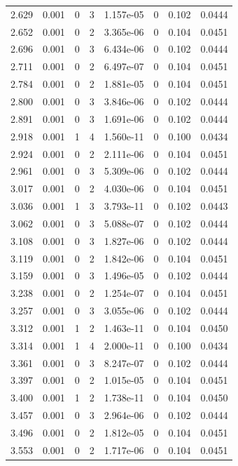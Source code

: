 \documentclass[preview]{standalone}
\begin{document}
{{{\begin{tabular}{L{1.2cm}C{1.2cm} C{0.3cm}C{0.5cm} C{1.4cm}C{1.4cm} C{1.4cm}C{1.4cm}}
  2.629  &  0.001  & 0     &  3 &  1.157e-05  & 0  & 0.102 &  0.0444   \\ 
  2.652  &  0.001  & 0     &  2 &  3.365e-06  & 0  & 0.104 &  0.0451   \\ 
  2.696  &  0.001  & 0     &  3 &  6.434e-06  & 0  & 0.102 &  0.0444   \\ 
  2.711  &  0.001  & 0     &  2 &  6.497e-07  & 0  & 0.104 &  0.0451   \\ 
  2.784  &  0.001  & 0     &  2 &  1.881e-05  & 0  & 0.104 &  0.0451   \\ 
  2.800  &  0.001  & 0     &  3 &  3.846e-06  & 0  & 0.102 &  0.0444   \\ 
  2.891  &  0.001  & 0     &  3 &  1.691e-06  & 0  & 0.102 &  0.0444   \\ 
  2.918  &  0.001  & 1     &  4 &  1.560e-11  & 0  & 0.100 &  0.0434   \\ 
  2.924  &  0.001  & 0     &  2 &  2.111e-06  & 0  & 0.104 &  0.0451   \\ 
  2.961  &  0.001  & 0     &  3 &  5.309e-06  & 0  & 0.102 &  0.0444   \\ 
  3.017  &  0.001  & 0     &  2 &  4.030e-06  & 0  & 0.104 &  0.0451   \\ 
  3.036  &  0.001  & 1     &  3 &  3.793e-11  & 0  & 0.102 &  0.0443   \\ 
  3.062  &  0.001  & 0     &  3 &  5.088e-07  & 0  & 0.102 &  0.0444   \\ 
  3.108  &  0.001  & 0     &  3 &  1.827e-06  & 0  & 0.102 &  0.0444   \\ 
  3.119  &  0.001  & 0     &  2 &  1.842e-06  & 0  & 0.104 &  0.0451   \\ 
  3.159  &  0.001  & 0     &  3 &  1.496e-05  & 0  & 0.102 &  0.0444   \\ 
  3.238  &  0.001  & 0     &  2 &  1.254e-07  & 0  & 0.104 &  0.0451   \\ 
  3.257  &  0.001  & 0     &  3 &  3.055e-06  & 0  & 0.102 &  0.0444   \\ 
  3.312  &  0.001  & 1     &  2 &  1.463e-11  & 0  & 0.104 &  0.0450   \\ 
  3.314  &  0.001  & 1     &  4 &  2.000e-11  & 0  & 0.100 &  0.0434   \\ 
  3.361  &  0.001  & 0     &  3 &  8.247e-07  & 0  & 0.102 &  0.0444   \\ 
  3.397  &  0.001  & 0     &  2 &  1.015e-05  & 0  & 0.104 &  0.0451   \\ 
  3.400  &  0.001  & 1     &  2 &  1.738e-11  & 0  & 0.104 &  0.0450   \\ 
  3.457  &  0.001  & 0     &  3 &  2.964e-06  & 0  & 0.102 &  0.0444   \\ 
  3.496  &  0.001  & 0     &  2 &  1.812e-05  & 0  & 0.104 &  0.0451   \\ 
  3.553  &  0.001  & 0     &  2 &  1.717e-06  & 0  & 0.104 &  0.0451   \\ 
\hline 
\end{tabular} 

}}}
\end{document}
